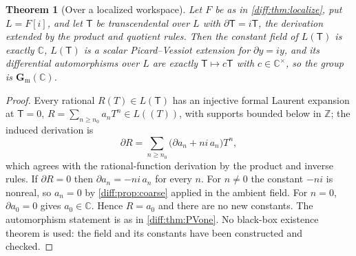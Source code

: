 \documentclass[11pt,letterpaper]{article}
\numberwithin{equation}{section}
\newtheorem{theorem}{Theorem}[section]
\theoremstyle{definition}
\theoremstyle{remark}
\newcommand{\C}{\mathbb C}
\newcommand{\Z}{\mathbb Z}
\newcommand{\der}{\partial}
\newcommand{\gm}{\mathbf G_{\mathrm m}}
\begin{document}
\begin{theorem}[Over a localized workspace]
\label{diff:thm:PVlocal}
Let $F$ be as in \cref{diff:thm:localize}, put $L=F[i]$, and let $\mathsf T$ be
transcendental over $L$ with $\der\mathsf T=i\mathsf T$, the derivation extended by the
product and quotient rules. Then the constant field of $L(\mathsf T)$ is exactly $\C$,
$L(\mathsf T)$ is a scalar Picard--Vessiot extension for $\der y=iy$, and its
differential automorphisms over $L$ are exactly $\mathsf T\mapsto c\mathsf T$ with
$c\in\C^{\times}$, so the group is $\gm(\C)$.
\end{theorem}
\begin{proof}
Every rational $R(T)\in L(\mathsf T)$ has an injective formal Laurent expansion at
$\mathsf T=0$, $R=\sum_{n\geq n_{0}}a_{n}T^{n}\in L((T))$, with supports bounded below
in $\Z$; the induced derivation is
\[
 \der R=\sum_{n\geq n_{0}}\bigl(\der a_{n}+ni\,a_{n}\bigr)T^{n},
\]
which agrees with the rational-function derivation by the product and inverse
rules. If $\der R=0$ then $\der a_{n}=-ni\,a_{n}$ for every $n$. For $n\neq0$
the constant $-ni$ is nonreal, so $a_{n}=0$ by \cref{diff:prop:coarse} applied
in the ambient field. For $n=0$, $\der a_{0}=0$ gives $a_{0}\in\C$. Hence
$R=a_{0}$ and there are no new constants. The automorphism statement is as in
\cref{diff:thm:PVone}. No black-box existence theorem is used: the field and
its constants have been constructed and checked.
\end{proof}
\end{document}
